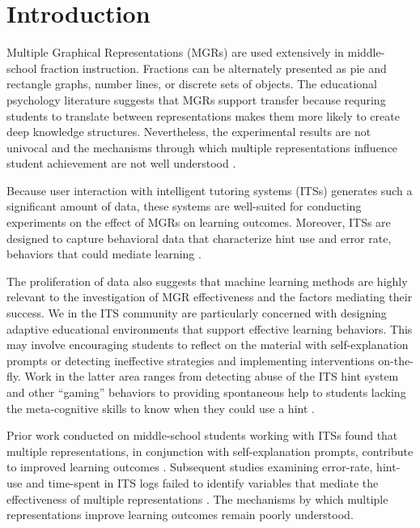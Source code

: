 \documentclass{edm_template}
\begin{document}

\section{Introduction}
\label{sec:introduction}

Multiple Graphical Representations (MGRs) are used extensively in middle-school fraction instruction.  Fractions can be alternately presented as pie and rectangle graphs, number lines, or discrete sets of objects. The educational psychology literature suggests that MGRs support transfer because requring students to translate between representations makes them more likely to create deep knowledge structures. Nevertheless, the experimental results are not univocal \cite{Ainsworth1999} and the mechanisms through which multiple representations influence student achievement are not well understood \cite{Ainsworth2006}. 

Because user interaction with intelligent tutoring systems (ITSs) generates such a significant amount of data, these systems are well-suited for conducting experiments on the effect of MGRs on learning outcomes. Moreover, ITSs are designed to capture behavioral data that characterize hint use and error rate, behaviors that could mediate learning \cite{Newell1981}.

 The proliferation of data also suggests that machine learning methods are highly relevant to the investigation of MGR effectiveness and the factors mediating their success. We in the ITS community are particularly concerned with designing adaptive educational environments that support effective learning behaviors. This may involve encouraging students to reflect on the material with self-explanation prompts \cite{Rau2009} or detecting ineffective strategies and implementing interventions on-the-fly. Work in the latter area ranges from detecting abuse of the ITS hint system and other ``gaming'' behaviors \cite{Baker2009} to providing spontaneous help to students lacking the meta-cognitive skills to know when they could use a hint \cite{Aleven2006}.

Prior work conducted on middle-school students working with ITSs found that multiple representations, in conjunction with self-explanation prompts, contribute to improved learning outcomes \cite{Rau2009}. Subsequent studies examining error-rate, hint-use and time-spent in ITS logs failed to identify variables that mediate the effectiveness of multiple representations \cite{Rau2012}. The mechanisms by which multiple representations improve learning outcomes remain poorly understood.
\end{document}
